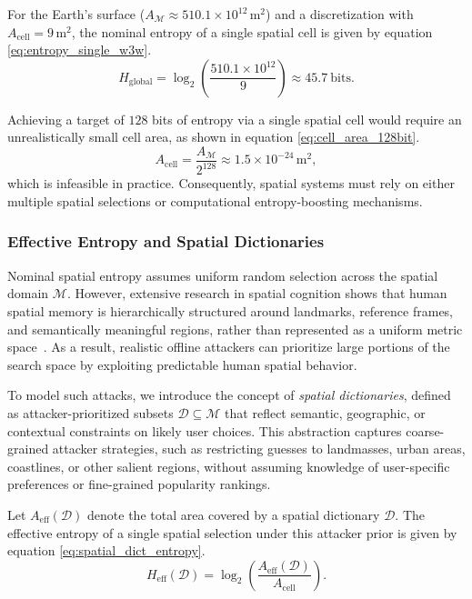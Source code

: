 \documentclass[journal,article,submit,pdftex,moreauthors]{Definitions/mdpi}
\begin{document}
For the Earth’s surface ($A_{\mathcal{M}} \approx 510.1 \times 10^{12}\,\text{m}^2$) and a discretization with $A_{\text{cell}} = 9\,\text{m}^2$, the nominal entropy of a single spatial cell is given by equation \ref{eq:entropy_single_w3w}.
\begin{equation}
H_{\text{global}} = \log_2\!\left(\frac{510.1 \times 10^{12}}{9}\right) \approx 45.7~\text{bits}.
\label{eq:entropy_single_w3w}
\end{equation}

Achieving a target of $128$ bits of entropy via a single spatial cell would require an unrealistically small cell area, as shown in equation \ref{eq:cell_area_128bit}.
\begin{equation}
A_{\text{cell}} = \frac{A_{\mathcal{M}}}{2^{128}} \approx 1.5 \times 10^{-24}\,\text{m}^2,
\label{eq:cell_area_128bit}
\end{equation}
which is infeasible in practice. Consequently, spatial systems must rely on either multiple spatial selections or computational entropy-boosting mechanisms.


\subsubsection{Effective Entropy and Spatial Dictionaries}

Nominal spatial entropy assumes uniform random selection across the spatial domain $\mathcal{M}$. However, extensive research in spatial cognition shows that human spatial memory is hierarchically structured around landmarks, reference frames, and semantically meaningful regions, rather than represented as a uniform metric space~\cite{Montello1998,McNamara2012}. As a result, realistic offline attackers can prioritize large portions of the search space by exploiting predictable human spatial behavior.

To model such attacks, we introduce the concept of \emph{spatial dictionaries}, defined as attacker-prioritized subsets $\mathcal{D} \subseteq \mathcal{M}$ that reflect semantic, geographic, or contextual constraints on likely user choices. This abstraction captures coarse-grained attacker strategies, such as restricting guesses to landmasses, urban areas, coastlines, or other salient regions, without assuming knowledge of user-specific preferences or fine-grained popularity rankings.

Let $A_{\text{eff}}(\mathcal{D})$ denote the total area covered by a spatial dictionary $\mathcal{D}$. The effective entropy of a single spatial selection under this attacker prior is given by equation \ref{eq:spatial_dict_entropy}.
\begin{equation}
H_{\text{eff}}(\mathcal{D}) = \log_2\!\left(\frac{A_{\text{eff}}(\mathcal{D})}{A_{\text{cell}}}\right).
\label{eq:spatial_dict_entropy}
\end{equation}
\end{document}
